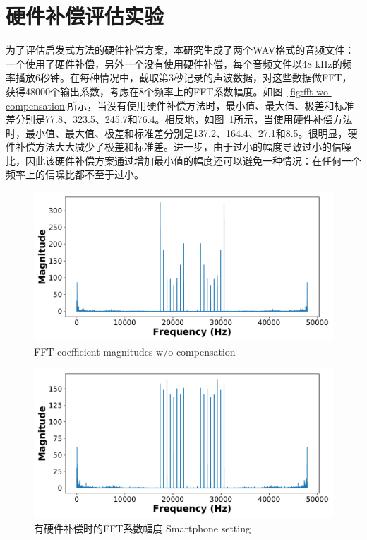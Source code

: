 \section{硬件补偿评估实验}
为了评估启发式方法的硬件补偿方案，本研究生成了两个WAV格式的音频文件：一个使用了硬件补偿，另外一个没有使用硬件补偿，每个音频文件以48 kHz的频率播放6秒钟。在每种情况中，截取第3秒记录的声波数据，对这些数据做FFT，获得48000个输出系数，考虑在8个频率上的FFT系数幅度。如图~\ref{fig:fft-wo-compensation}所示，当没有使用硬件补偿方法时，最小值、最大值、极差和标准差分别是77.8、323.5、245.7和76.4。相反地，如图~\ref{fig:fft-compensation}所示，当使用硬件补偿方法时，最小值、最大值、极差和标准差分别是137.2、164.4、27.1和8.5。很明显，硬件补偿方法大大减少了极差和标准差。进一步，由于过小的幅度导致过小的信噪比，因此该硬件补偿方案通过增加最小值的幅度还可以避免一种情况：在任何一个频率上的信噪比都不至于过小。
\begin{figure}
  \centering
  \begin{minipage}[t]{0.49\textwidth}
    \centering
    \includegraphics[width=\textwidth]{figure/nocompensation.pdf}
      {FFT coefficient magnitudes w/o compensation}
        \label{fig:fft-wo-compensation}
  \end{minipage}
  \centering
  \begin{minipage}[t]{0.49\textwidth}
    \centering
    \includegraphics[width=\textwidth]{figure/compensation.pdf}
    \bicaption
    {有硬件补偿时的FFT系数幅度}
    {Smartphone setting}
    \label{fig:fft-compensation}
   \end{minipage}
\end{figure}

